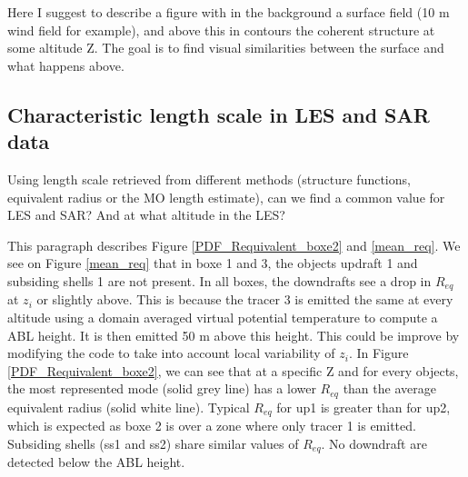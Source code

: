 \documentclass[draft]{agujournal2019} %
\begin{document}
            Here I suggest to describe a figure with in the background a surface field (10 m wind field for example), and above this in contours the coherent structure at some altitude Z. The goal is to find visual similarities between the surface and what happens above.

            \subsection{Characteristic length scale in LES and SAR data}
            \label{subsection_scales_in_LES_and_SAR}

            Using length scale retrieved from different methods (structure functions, equivalent radius or the MO length estimate), can we find a common value for LES and SAR? And at what altitude in the LES?

            This paragraph describes Figure \ref{PDF_Requivalent_boxe2} and \ref{mean_req}. We see on Figure \ref{mean_req} that in boxe 1 and 3, the objects updraft 1 and subsiding shells 1 are not present. In all boxes, the downdrafts see a drop in $R_{eq}$ at $z_i$ or slightly above. This is because the tracer 3 is emitted the same at every altitude using a domain averaged virtual potential temperature to compute a ABL height. It is then emitted 50 m above this height. This could be improve by modifying the code to take into account local variability of $z_i$. In Figure \ref{PDF_Requivalent_boxe2}, we can see that at a specific Z and for every objects, the most represented mode (solid grey line) has a lower $R_{eq}$ than the average equivalent radius (solid white line). Typical $R_{eq}$ for up1 is greater than for up2, which is expected as boxe 2 is over a zone where only tracer 1 is emitted. Subsiding shells (ss1 and ss2) share similar values of $R_{eq}$. No downdraft are detected below the ABL height.
\end{document}
